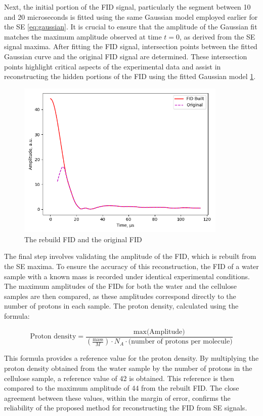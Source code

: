\documentclass[a4paper,12pt]{article}
\begin{document}
Next, the initial portion of the FID signal, particularly the segment between 10 and 20 microseconds is fitted using the same Gaussian model employed earlier for the SE \cref{eq:gaussian}. 
It is crucial to ensure that the amplitude of the Gaussian fit matches the maximum amplitude observed at time $t = 0$, as derived from the SE signal maxima.
After fitting the FID signal, intersection points between the fitted Gaussian curve and the original FID signal are determined. 
These intersection points highlight critical aspects of the experimental data and assist in reconstructing the hidden portions of the FID using the fitted Gaussian model \cref{fig:Rebuild_FID}.

\begin{figure}[H]
  \centering
  \includegraphics[width=10cm]{images/Rebuild_FID.png}
  \caption{The rebuild FID and the original FID}
  \label{fig:Rebuild_FID}
\end{figure}

The final step involves validating the amplitude of the FID, which is rebuilt from the SE maxima. To ensure the accuracy of this reconstruction, the FID of a water sample with a known mass is recorded under identical experimental conditions. The maximum amplitudes of the FIDs for both the water and the cellulose samples are then compared, as these amplitudes correspond directly to the number of protons in each sample. The proton density, calculated using the formula:

\begin{equation}
  \label{eq:proton_density}
  \text{Proton density} = \frac{\text{max(Amplitude)}}{ \left(\frac{\text{mass}}{M}\right) \cdot N_A \cdot \text{(number of protons per molecule)} }
\end{equation}

This formula provides a reference value for the proton density. 
By multiplying the proton density obtained from the water sample by the number of protons in the cellulose sample, a reference value of 42 is obtained. 
This reference is then compared to the maximum amplitude of 44 from the rebuilt FID. 
The close agreement between these values, within the margin of error, confirms the reliability of the proposed method for reconstructing the FID from SE signals.
\end{document}
